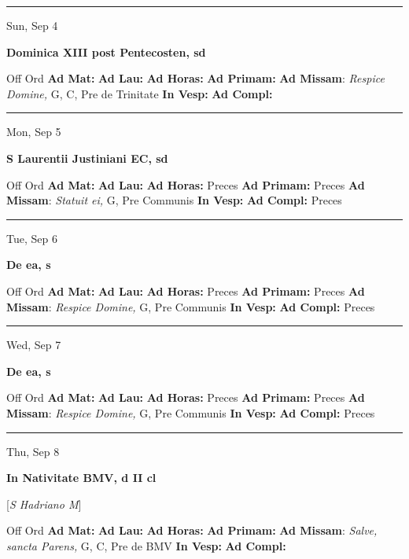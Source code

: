 \documentclass[letterpaper, 10pt]{article}
\begin{document}
\hrule
\begin{center}
Sun, Sep 4
\end{center}\textbf{ \large Dominica XIII post Pentecosten, \textnormal{\normalsize sd}}
\begin{justify}
Off Ord
\textbf{Ad Mat: }
\textbf{Ad Lau: }
\textbf{Ad Horas: }
\textbf{Ad Primam: }
\textbf{Ad Missam}: \textit{Respice Domine,} G, C, Pre de Trinitate
\textbf{In Vesp: }
\textbf{Ad Compl: }\end{justify}



\hrule
\begin{center}
Mon, Sep 5
\end{center}\textbf{ \large S Laurentii Justiniani EC, \textnormal{\normalsize sd}}
\begin{justify}
Off Ord
\textbf{Ad Mat: }
\textbf{Ad Lau: }
\textbf{Ad Horas: }Preces
\textbf{Ad Primam: }Preces
\textbf{Ad Missam}: \textit{Statuit ei,} G, Pre Communis
\textbf{In Vesp: }
\textbf{Ad Compl: }Preces\end{justify}



\hrule
\begin{center}
Tue, Sep 6
\end{center}\textbf{ \large De ea, \textnormal{\normalsize s}}
\begin{justify}
Off Ord
\textbf{Ad Mat: }
\textbf{Ad Lau: }
\textbf{Ad Horas: }Preces
\textbf{Ad Primam: }Preces
\textbf{Ad Missam}: \textit{Respice Domine,} G, Pre Communis
\textbf{In Vesp: }
\textbf{Ad Compl: }Preces\end{justify}



\hrule
\begin{center}
Wed, Sep 7
\end{center}\textbf{ \large De ea, \textnormal{\normalsize s}}
\begin{justify}
Off Ord
\textbf{Ad Mat: }
\textbf{Ad Lau: }
\textbf{Ad Horas: }Preces
\textbf{Ad Primam: }Preces
\textbf{Ad Missam}: \textit{Respice Domine,} G, Pre Communis
\textbf{In Vesp: }
\textbf{Ad Compl: }Preces\end{justify}



\hrule
\begin{center}
Thu, Sep 8
\end{center}\textbf{ \large In Nativitate BMV, \textnormal{\normalsize d II cl}}

[\textit{S Hadriano M}]
\begin{justify}
Off Ord
\textbf{Ad Mat: }
\textbf{Ad Lau: }
\textbf{Ad Horas: }
\textbf{Ad Primam: }
\textbf{Ad Missam}: \textit{Salve, sancta Parens,} G, C, Pre de BMV
\textbf{In Vesp: }
\textbf{Ad Compl: }\end{justify}
\end{document}
